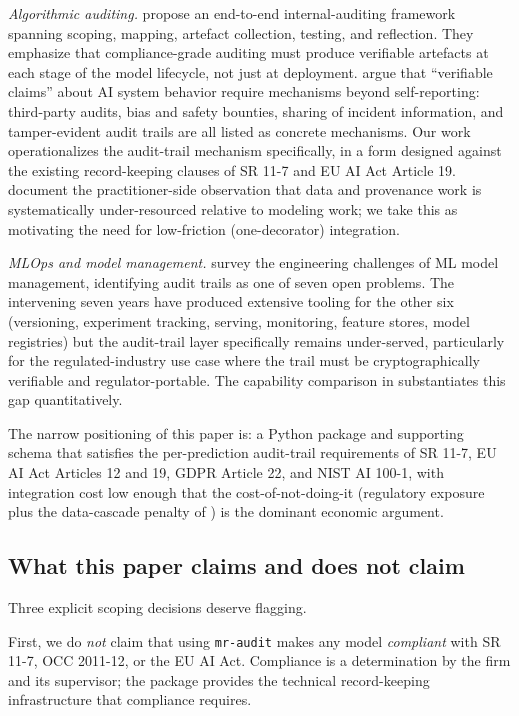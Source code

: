 \textit{Algorithmic auditing.} \citet{Raji2020Audit} propose an end-to-end internal-auditing framework spanning scoping, mapping, artefact collection, testing, and reflection. They emphasize that compliance-grade auditing must produce verifiable artefacts at each stage of the model lifecycle, not just at deployment. \citet{BrundageVerifiableClaims2020} argue that ``verifiable claims'' about AI system behavior require mechanisms beyond self-reporting: third-party audits, bias and safety bounties, sharing of incident information, and tamper-evident audit trails are all listed as concrete mechanisms. Our work operationalizes the audit-trail mechanism specifically, in a form designed against the existing record-keeping clauses of SR 11-7 and EU AI Act Article 19. \citet{Sambasivan2021Cascades} document the practitioner-side observation that data and provenance work is systematically under-resourced relative to modeling work; we take this as motivating the need for low-friction (one-decorator) integration.

\textit{MLOps and model management.} \citet{SchelterContinuousIntegration2018} survey the engineering challenges of ML model management, identifying audit trails as one of seven open problems. The intervening seven years have produced extensive tooling for the other six (versioning, experiment tracking, serving, monitoring, feature stores, model registries) but the audit-trail layer specifically remains under-served, particularly for the regulated-industry use case where the trail must be cryptographically verifiable and regulator-portable. The capability comparison in  substantiates this gap quantitatively.

The narrow positioning of this paper is: a Python package and supporting schema that satisfies the per-prediction audit-trail requirements of SR 11-7, EU AI Act Articles 12 and 19, GDPR Article 22, and NIST AI 100-1, with integration cost low enough that the cost-of-not-doing-it (regulatory exposure plus the data-cascade penalty of \citealp{Sambasivan2021Cascades}) is the dominant economic argument.

\subsection{What this paper claims and does not claim}

Three explicit scoping decisions deserve flagging.

First, we do \emph{not} claim that using \texttt{mr-audit} makes any model \emph{compliant} with SR 11-7, OCC 2011-12, or the EU AI Act. Compliance is a determination by the firm and its supervisor; the package provides the technical record-keeping infrastructure that compliance requires.

